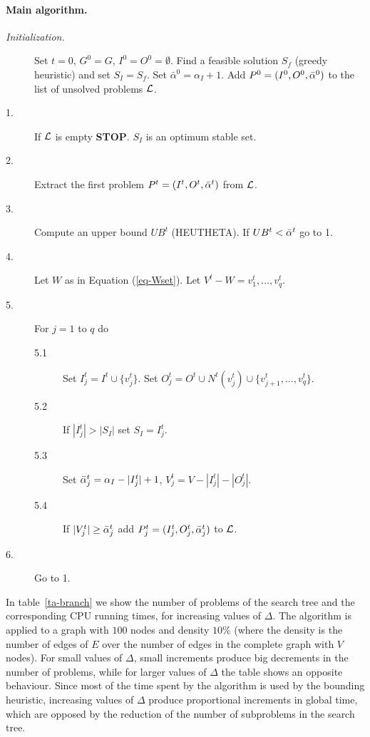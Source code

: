  \paragraph{Main algorithm.}
\begin{description}
\item[{\it Initialization.}] Set $t=0$, $G^0=G$, $I^0=O^0=
\emptyset$.  Find a feasible solution $S_f$ (greedy heuristic) 
and  set $S_I = S_f$. Set $\bar \alpha^0 = \alpha_I + 1$. Add 
$P^0=(I^0,O^0,{\bar \alpha}^0)$ to the list of unsolved problems ${\cal L}$. 

\item[1.] If ${\cal L}$ is empty {\bf STOP}. $S_I$ is an optimum
stable set.

\item[2.] Extract the first problem $P^t=(I^t,O^t,{\bar \alpha}^t)$ from
${\cal L}$.

\item[3.] Compute an upper bound $UB^t$ (HEUTHETA).  If $UB^t <
        {\bar \alpha}^t$ go to 1.

\item[4.] Let $W$ as in Equation (\ref{eq-Wset}). Let $V^t- W =
      v^t_1,\dots,v^t_q$. 

\item[5.] For $j = 1$ to $q$ do 
\begin{description}
  \item[5.1] Set $I^t_j = I^t \cup \{v^t_j\}$. Set 
  $O^t_j = O^t \cup N^t(v^t_j) \cup \{v^t_{j+1},\dots,v^t_q\}$.

\item[5.2] If  $|I^t_j| > |S_I|$ set $S_I =  I^t_j$. 

\item[5.3] Set ${\bar \alpha}^t_j = \alpha_I - |I^t_j| + 1$, 
$V^t_j=V-|I^t_j|-|O^t_j|$.

\item[5.4] If $|V^t_j| \geq {\bar \alpha}^t_j$ add 
$P^t_j=(I^t_j,O^t_j,{\bar \alpha}^t_j)$ to ${\cal L}$.
\end{description}

\item[6.] Go to 1.
\end{description}
     
In table~\ref{ta-branch} we show the number of problems of the
search tree and the corresponding CPU running times, for increasing
values of $\Delta$. The algorithm is applied to a graph with 
$100$ nodes and density $10\%$ (where the density is the number of
edges of $E$ over the number of edges in the complete graph with $V$
nodes). For small values of $\Delta$, small increments produce big
decrements in the number of problems, while for larger values of
$\Delta$ the table shows an opposite behaviour. Since most of the
time spent by the algorithm is used by the bounding heuristic,
increasing values of $\Delta$ produce proportional increments in
global time, which are opposed by the reduction of the number
of subproblems in the search tree.  


